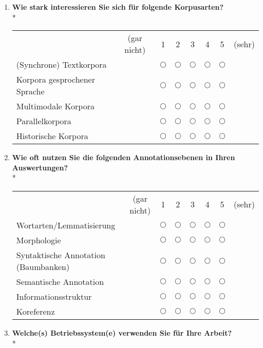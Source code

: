 \begin{enumerate}
	\item{
		\textbf{Wie stark interessieren Sie sich für folgende Korpusarten?}\\*
		\begin{center}
			\begin{tabular}{l c c c  c c c c}
					 & (gar nicht) & 1 & 2 & 3 & 4 & 5 & (sehr) \\
					(Synchrone) Textkorpora & &  $\bigcirc$ & $\bigcirc$ & $\bigcirc$ & $\bigcirc$ & $\bigcirc$ \\ \hline
					Korpora gesprochener Sprache & &  $\bigcirc$ & $\bigcirc$ & $\bigcirc$ & $\bigcirc$ & $\bigcirc$ \\ \hline
					Multimodale Korpora & &  $\bigcirc$ & $\bigcirc$ & $\bigcirc$ & $\bigcirc$ & $\bigcirc$ \\ \hline
					Parallelkorpora & &  $\bigcirc$ & $\bigcirc$ & $\bigcirc$ & $\bigcirc$ & $\bigcirc$ \\ \hline
					Historische Korpora & &  $\bigcirc$ & $\bigcirc$ & $\bigcirc$ & $\bigcirc$ & $\bigcirc$
			\end{tabular}
		\end{center}
	}
	
	\item{
		\textbf{Wie oft nutzen Sie die folgenden Annotationsebenen in Ihren Auswertungen?}\\*
		\begin{center}
			\begin{tabular}{l c c c  c c c c}
					 & (gar nicht) & 1 & 2 & 3 & 4 & 5 & (sehr) \\
					Wortarten/Lemmatisierung & &  $\bigcirc$ & $\bigcirc$ & $\bigcirc$ & $\bigcirc$ & $\bigcirc$ \\ \hline
					Morphologie & &  $\bigcirc$ & $\bigcirc$ & $\bigcirc$ & $\bigcirc$ & $\bigcirc$ \\ \hline
					Syntaktische Annotation (Baumbanken) & &  $\bigcirc$ & $\bigcirc$ & $\bigcirc$ & $\bigcirc$ & $\bigcirc$ \\ \hline
					Semantische Annotation & &  $\bigcirc$ & $\bigcirc$ & $\bigcirc$ & $\bigcirc$ & $\bigcirc$ \\ \hline
					Informationsstruktur & &  $\bigcirc$ & $\bigcirc$ & $\bigcirc$ & $\bigcirc$ & $\bigcirc$ \\ \hline
					Koreferenz & &  $\bigcirc$ & $\bigcirc$ & $\bigcirc$ & $\bigcirc$ & $\bigcirc$
			\end{tabular}
		\end{center}
	}
	
	\item{
		\textbf{Welche(s) Betriebssystem(e) verwenden Sie für Ihre Arbeit?}\\*

}
\end{enumerate}
